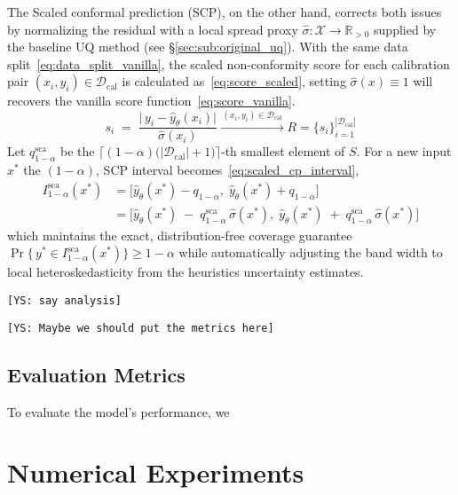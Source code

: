 \documentclass[preprint,12pt]{elsarticle}
\newcommand{\cys}[1]{{\small \color{blue} \tt [YS: #1]}}
\begin{document}
The Scaled conformal prediction (SCP), on the other hand, corrects both issues by normalizing the residual with a local spread proxy $\hat\sigma:\mathcal X\!\to\!\mathbb R_{>0}$ supplied by the baseline UQ method (see \S\ref{sec:sub:original_uq}). With the same data split~\eqref{eq:data_split_vanilla}, the scaled non-conformity score for each calibration pair $(x_i,y_i)\in\mathcal D_{\mathrm{cal}}$ is calculated as~\eqref{eq:score_scaled}, setting $\hat\sigma(x)\equiv 1$ will recovers the vanilla score function~\eqref{eq:score_vanilla}. 
\begin{equation}
  s_i \;=\;
    \frac{\bigl|\,y_i - \hat y_{\theta}(x_i)\bigr|}
        {\hat\sigma(x_i)}
    \xrightarrow{\,(x_i,y_i)\in\mathcal D_{\mathrm{cal}}\,}
    R = \{s_i\}_{i=1}^{|\mathcal D_{\mathrm{cal}}|}
\label{eq:score_scaled}
\end{equation}
Let $q^{\mathrm{sca}}_{1-\alpha}$ be the $\bigl\lceil (1-\alpha)\bigl(|\mathcal D_{\mathrm{cal}}|+1\bigr)\bigr\rceil$-th smallest element of $S$. For a new input $x^\ast$ the $(1-\alpha)$, SCP interval becomes~\eqref{eq:scaled_cp_interval}, 
\begin{equation}
\begin{aligned}
    I^{\mathrm{sca}}_{1-\alpha}(x^\ast)
    &=
    \bigl[
        \hat y_{\theta}(x^\ast) - q_{1-\alpha},\;
        \hat y_{\theta}(x^\ast) + q_{1-\alpha}
    \bigr]\\
    &=
    \bigl[
        \hat y_{\theta}(x^\ast) \;-\; q^{\mathrm{sca}}_{1-\alpha}\,\hat\sigma(x^\ast),\;
        \hat y_{\theta}(x^\ast) \;+\; q^{\mathrm{sca}}_{1-\alpha}\,\hat\sigma(x^\ast)
    \bigr]
\label{eq:scaled_cp_interval}
\end{aligned}
\end{equation}
which maintains the exact, distribution-free coverage guarantee $\Pr\!\bigl\{\,y^\ast\in I^{\mathrm{sca}}_{1-\alpha}(x^\ast)\bigr\}\ge 1-\alpha$ while automatically adjusting the band width to local heteroskedasticity from the heuristics uncertainty estimates.

\cys{say analysis}

\cys{Maybe we should put the metrics here}

\subsection{Evaluation Metrics}
\label{sec:metrics}

To evaluate the model's performance, we 


\section{Numerical Experiments}
\label{sec:numerics}
\end{document}
